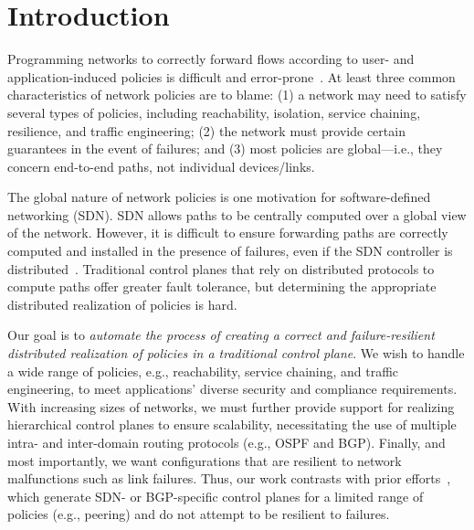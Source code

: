 \section{Introduction}
Programming networks to correctly forward flows according to user- and
application-induced policies is difficult and
error-prone~\cite{troubleshooting, bgpmisconfig}. At least three
common characteristics of network policies are to blame: (1) a network
may need to satisfy several types of policies, including reachability,
isolation, service chaining, resilience, and traffic engineering; (2)
the network must provide certain guarantees in the event of failures;
and (3) most policies are global---i.e., they concern end-to-end
paths, not individual devices/links.

The global nature of network policies is one motivation for
software-defined networking (SDN). SDN allows paths to be centrally
computed over a global view of the network. However, it is difficult
to ensure forwarding paths are correctly computed and installed in the
presence of failures, even if the SDN controller is
distributed~\cite{hasdn}.  Traditional control planes that rely on
distributed protocols to compute paths offer greater fault tolerance,
but determining the appropriate distributed realization of policies is
hard.

Our goal is to {\em automate the process of creating a correct
and failure-resilient
  distributed realization of policies in a traditional control
  plane}. We wish to handle a wide range of policies, e.g.,
reachability, service chaining, and traffic engineering, to meet
applications' diverse security and compliance requirements. 
With
increasing sizes of networks, we must further provide support for
realizing hierarchical control planes to ensure scalability,
necessitating the use of multiple intra- and inter-domain routing
protocols (e.g., OSPF and BGP). 
Finally, and most importantly, we want
configurations that are resilient to network malfunctions such as link
failures.
Thus, our work contrasts with prior efforts~\cite{netegg,
  propane, merlin,simple,fattire, netkat, netkatcompiler, sol}, which
generate SDN- or BGP-specific control planes for a limited range of
policies (e.g., peering) and do not attempt to be resilient to failures.



